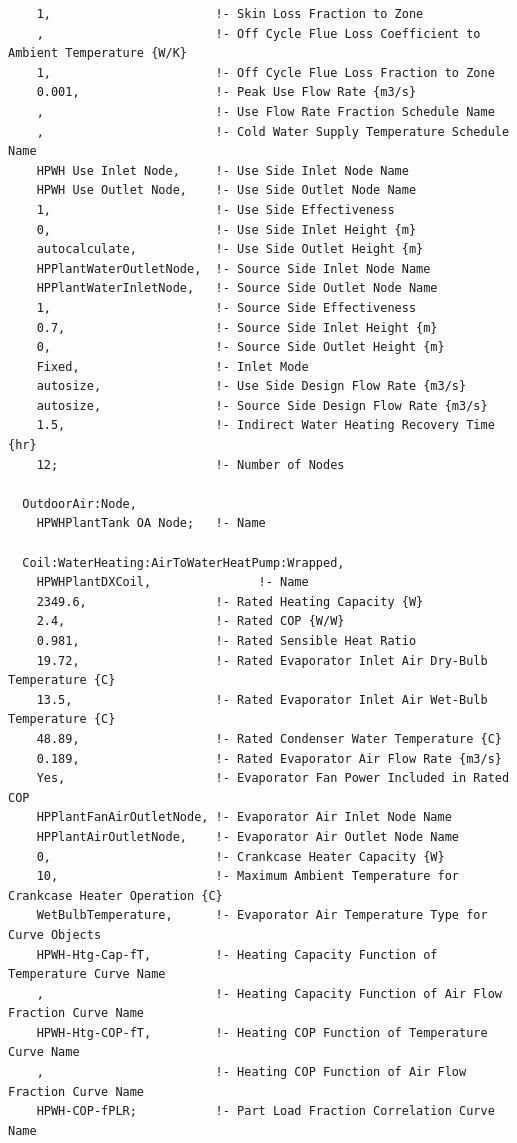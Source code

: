 \begin{lstlisting}
    1,                       !- Skin Loss Fraction to Zone
    ,                        !- Off Cycle Flue Loss Coefficient to Ambient Temperature {W/K}
    1,                       !- Off Cycle Flue Loss Fraction to Zone
    0.001,                   !- Peak Use Flow Rate {m3/s}
    ,                        !- Use Flow Rate Fraction Schedule Name
    ,                        !- Cold Water Supply Temperature Schedule Name
    HPWH Use Inlet Node,     !- Use Side Inlet Node Name
    HPWH Use Outlet Node,    !- Use Side Outlet Node Name
    1,                       !- Use Side Effectiveness
    0,                       !- Use Side Inlet Height {m}
    autocalculate,           !- Use Side Outlet Height {m}
    HPPlantWaterOutletNode,  !- Source Side Inlet Node Name
    HPPlantWaterInletNode,   !- Source Side Outlet Node Name
    1,                       !- Source Side Effectiveness
    0.7,                     !- Source Side Inlet Height {m}
    0,                       !- Source Side Outlet Height {m}
    Fixed,                   !- Inlet Mode
    autosize,                !- Use Side Design Flow Rate {m3/s}
    autosize,                !- Source Side Design Flow Rate {m3/s}
    1.5,                     !- Indirect Water Heating Recovery Time {hr}
    12;                      !- Number of Nodes

  OutdoorAir:Node,
    HPWHPlantTank OA Node;   !- Name

  Coil:WaterHeating:AirToWaterHeatPump:Wrapped,
    HPWHPlantDXCoil,               !- Name
    2349.6,                  !- Rated Heating Capacity {W}
    2.4,                     !- Rated COP {W/W}
    0.981,                   !- Rated Sensible Heat Ratio
    19.72,                   !- Rated Evaporator Inlet Air Dry-Bulb Temperature {C}
    13.5,                    !- Rated Evaporator Inlet Air Wet-Bulb Temperature {C}
    48.89,                   !- Rated Condenser Water Temperature {C}
    0.189,                   !- Rated Evaporator Air Flow Rate {m3/s}
    Yes,                     !- Evaporator Fan Power Included in Rated COP
    HPPlantFanAirOutletNode, !- Evaporator Air Inlet Node Name
    HPPlantAirOutletNode,    !- Evaporator Air Outlet Node Name
    0,                       !- Crankcase Heater Capacity {W}
    10,                      !- Maximum Ambient Temperature for Crankcase Heater Operation {C}
    WetBulbTemperature,      !- Evaporator Air Temperature Type for Curve Objects
    HPWH-Htg-Cap-fT,         !- Heating Capacity Function of Temperature Curve Name
    ,                        !- Heating Capacity Function of Air Flow Fraction Curve Name
    HPWH-Htg-COP-fT,         !- Heating COP Function of Temperature Curve Name
    ,                        !- Heating COP Function of Air Flow Fraction Curve Name
    HPWH-COP-fPLR;           !- Part Load Fraction Correlation Curve Name


\end{lstlisting}
